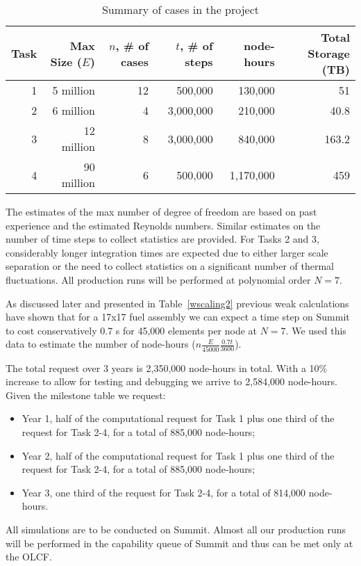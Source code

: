 \begin{table}
\centering
\caption{Summary of cases in the project}
\begin{tabular}{rrrrrr}
\hline
\hline
Task & Max Size ($E$) &  $n$, \# of cases  & $t$, \# of steps & node-hours & Total Storage (TB)\\
\hline
\hline
1 & 5 million       & 12   & 500,000   &    130,000 & 51\\
2 & 6 million       & 4    & 3,000,000 &    210,000 & 40.8\\
3 & 12 million      & 8    & 3,000,000 &    840,000 & 163.2\\
4 & ~90 million  & 6    & 500,000   &  1,170,000 & 459\\
\hline
\hline
\end{tabular}
\label{tab:cases}
\end{table}

The estimates of the max number of degree of freedom are based  on past
experience and the estimated Reynolds numbers. Similar estimates on the number
of time steps to collect statistics are provided. For Tasks 2 and 3,
considerably longer integration times are expected due to either larger scale
separation or the need to collect statistics on a significant number of thermal
fluctuations. All production runs will be performed at polynomial order $N=7$.

As discussed later and presented in Table~\ref{wscaling2} previous weak
calculations have shown that for a 17x17 fuel assembly we can expect a time
step on Summit to cost conservatively 0.7 s for 45,000 elements per node at $N=7$. We
used this data to estimate the number of node-hours
($n\frac{E}{45000}\frac{0.7t}{3600}$).

The total request over 3 years is 2,350,000 node-hours in total. With a 10\% increase to allow for testing and debugging we arrive to 2,584,000 node-hours. Given the milestone table we request:
\begin{itemize}
    \item Year 1, half of the computational request for Task 1 plus one third of the request for Task 2-4, for a total of 885,000 node-hours;
    \item Year 2, half of the computational request for Task 1 plus one third of the request for Task 2-4, for a total of 885,000 node-hours;
    \item Year 3, one third of the request for Task 2-4, for a total of 814,000 node-hours.
\end{itemize}
All simulations are to be conducted on Summit. Almost all our production runs will be performed in the capability queue of Summit and thus can be met only at the OLCF.

